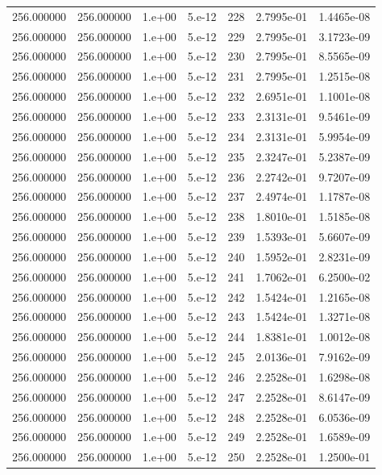 \begin{table}[htbp]
\begin{tabular}{rrrrrrr}
256.000000 & 256.000000 & 1.e+00 & 5.e-12 & 228 & 2.7995e-01 & 1.4465e-08 \\
256.000000 & 256.000000 & 1.e+00 & 5.e-12 & 229 & 2.7995e-01 & 3.1723e-09 \\
256.000000 & 256.000000 & 1.e+00 & 5.e-12 & 230 & 2.7995e-01 & 8.5565e-09 \\
256.000000 & 256.000000 & 1.e+00 & 5.e-12 & 231 & 2.7995e-01 & 1.2515e-08 \\
256.000000 & 256.000000 & 1.e+00 & 5.e-12 & 232 & 2.6951e-01 & 1.1001e-08 \\
256.000000 & 256.000000 & 1.e+00 & 5.e-12 & 233 & 2.3131e-01 & 9.5461e-09 \\
256.000000 & 256.000000 & 1.e+00 & 5.e-12 & 234 & 2.3131e-01 & 5.9954e-09 \\
256.000000 & 256.000000 & 1.e+00 & 5.e-12 & 235 & 2.3247e-01 & 5.2387e-09 \\
256.000000 & 256.000000 & 1.e+00 & 5.e-12 & 236 & 2.2742e-01 & 9.7207e-09 \\
256.000000 & 256.000000 & 1.e+00 & 5.e-12 & 237 & 2.4974e-01 & 1.1787e-08 \\
256.000000 & 256.000000 & 1.e+00 & 5.e-12 & 238 & 1.8010e-01 & 1.5185e-08 \\
256.000000 & 256.000000 & 1.e+00 & 5.e-12 & 239 & 1.5393e-01 & 5.6607e-09 \\
256.000000 & 256.000000 & 1.e+00 & 5.e-12 & 240 & 1.5952e-01 & 2.8231e-09 \\
256.000000 & 256.000000 & 1.e+00 & 5.e-12 & 241 & 1.7062e-01 & 6.2500e-02 \\
256.000000 & 256.000000 & 1.e+00 & 5.e-12 & 242 & 1.5424e-01 & 1.2165e-08 \\
256.000000 & 256.000000 & 1.e+00 & 5.e-12 & 243 & 1.5424e-01 & 1.3271e-08 \\
256.000000 & 256.000000 & 1.e+00 & 5.e-12 & 244 & 1.8381e-01 & 1.0012e-08 \\
256.000000 & 256.000000 & 1.e+00 & 5.e-12 & 245 & 2.0136e-01 & 7.9162e-09 \\
256.000000 & 256.000000 & 1.e+00 & 5.e-12 & 246 & 2.2528e-01 & 1.6298e-08 \\
256.000000 & 256.000000 & 1.e+00 & 5.e-12 & 247 & 2.2528e-01 & 8.6147e-09 \\
256.000000 & 256.000000 & 1.e+00 & 5.e-12 & 248 & 2.2528e-01 & 6.0536e-09 \\
256.000000 & 256.000000 & 1.e+00 & 5.e-12 & 249 & 2.2528e-01 & 1.6589e-09 \\
256.000000 & 256.000000 & 1.e+00 & 5.e-12 & 250 & 2.2528e-01 & 1.2500e-01 \\

\end{tabular}
\end{table}
